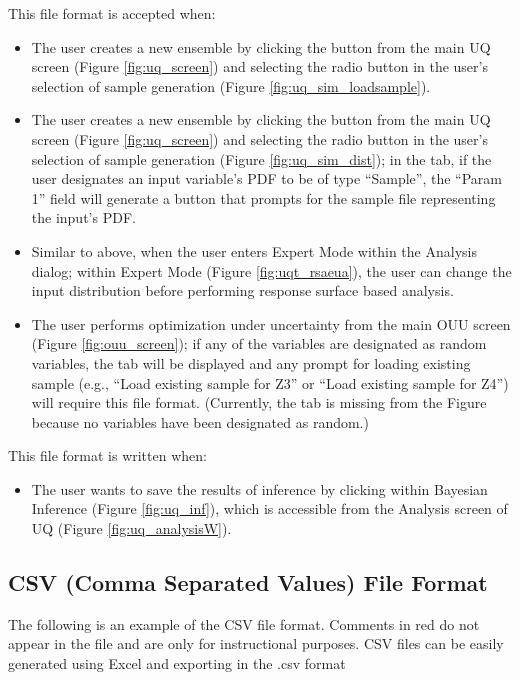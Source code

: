 This file format is accepted when:
\begin{itemize}
\item{The user creates a new ensemble by clicking the  button
  from the main UQ screen (Figure \ref{fig:uq_screen}) and selecting
  the  radio button in the user's selection
  of sample generation (Figure \ref{fig:uq_sim_loadsample}).}
\item{The user creates a new ensemble by clicking the  button
  from the main UQ screen (Figure \ref{fig:uq_screen}) and selecting
  the  radio button in the user's selection
  of sample generation (Figure \ref{fig:uq_sim_dist}); in the
   tab, if the user designates an input variable's PDF to be of
  type ``Sample'', the ``Param 1'' field will generate a  button that prompts for the sample file representing the input's PDF.}
\item{Similar to above, when the user enters Expert Mode within the Analysis
  dialog;
  within Expert Mode (Figure \ref{fig:uqt_rsaeua}), the user can change the input distribution before
  performing response surface based analysis.} 
\item{The user performs optimization under uncertainty from the main OUU screen
  (Figure \ref{fig:ouu_screen});
  if any of the variables are designated as random variables, the  tab will be displayed and
    any prompt for loading existing sample (e.g., ``Load existing sample
    for Z3'' or ``Load existing sample for Z4'') will require this file
    format. (Currently, the  tab is missing from the Figure
    because no variables have been designated as random.)}
\end{itemize}

This file format is written when:
\begin{itemize}
\item{The user wants to save the results of inference by clicking   within Bayesian Inference (Figure
  \ref{fig:uq_inf}), which is accessible from the Analysis screen of UQ
  (Figure \ref{fig:uq_analysisW}).}
\end{itemize}

\subsection{CSV (Comma Separated Values) File Format}
The following is an example of the CSV file format. Comments in red do not appear in the file and are only for instructional purposes. CSV files can be easily generated using Excel and exporting in the .csv format

